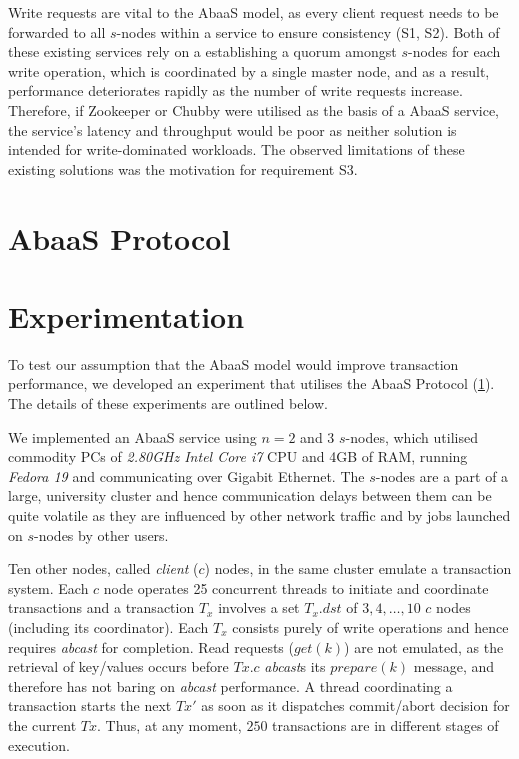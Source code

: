 Write requests are vital to the \textsf{AbaaS} model, as every client request needs to be forwarded to all $s$-nodes within a service to ensure consistency (S1, S2).  Both of these existing services rely on a establishing a quorum amongst $s$-nodes for each write operation, which is coordinated by a single master node, and as a result, performance deteriorates rapidly as the number of write requests increase.  Therefore, if Zookeeper or Chubby were utilised as the basis of a \textsf{AbaaS} service, the service's latency and throughput would be poor as neither solution is intended for write-dominated workloads.  The observed limitations of these existing solutions was the motivation for requirement S3.  

\section{AbaaS Protocol}\label{sec:decoupled_protocol}


\section{Experimentation}

To test our assumption that the \textsf{AbaaS} model would improve transaction performance, we developed an experiment that utilises the \textsf{AbaaS} Protocol (\ref{sec:decoupled_protocol}).  The details of these experiments are outlined below. 

We implemented an \textsf{AbaaS} service using $n=2$ and $3$ $s$-nodes, which utilised commodity PCs of \emph{2.80GHz Intel Core i7} CPU and 4GB of RAM, running \emph{Fedora 19} and communicating over Gigabit Ethernet. The $s$-nodes are a part of a large, university cluster and hence communication delays between them can be quite volatile as they are influenced by other network traffic and by jobs launched on $s$-nodes by other users.

Ten other nodes, called \emph{client} ($c$) nodes, in the same cluster emulate a transaction system. Each $c$ node operates 25 concurrent threads to initiate and coordinate transactions and a transaction $T_x$ involves a set $T_x.dst$ of $3,4,\ldots,10$ $c$ nodes (including its coordinator). Each $T_x$ consists purely of write operations and hence requires \emph{abcast} for completion. Read requests ($get(k)$) are not emulated, as the retrieval of key/values occurs before $Tx.c$ \emph{abcast}s its $prepare(k)$ message, and therefore has not baring on \emph{abcast} performance.  A thread coordinating a transaction starts the next $Tx'$ as soon as it dispatches commit/abort decision for the current $Tx$. Thus, at any moment, $250$ transactions are in different stages of execution.


